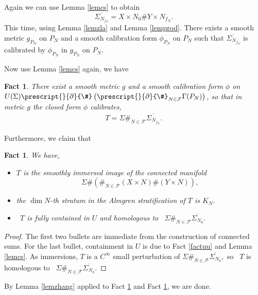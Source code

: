 \documentclass[11pt,a4paper]{amsart}
\numberwithin{equation}{section}
\newcommand{\Ga}{\Gamma}
\newcommand{\Si}{\Sigma}
\newcommand{\bcs}{\prescript{}{\pd}{\#}}
\newcommand{\ov}[1]{\overline{#1}}
\newcommand{\pd}{\partial}
\theoremstyle{plain}
\newtheorem{fact}[exam]{Fact}
\theoremstyle{definition}
\numberwithin{equation}{subsection}
\begin{document}
	Again we can use Lemma \ref{lemcs} to obtain $$\ov{\Si_{N_{f_N}}}=X\times N_0\# Y\times N_{f_N}.$$ This time, using Lemma \ref{lemzla} and Lemma \ref{lemprod}. There exists a smooth metric $g_{P_N}$ on $P_N$ and a smooth calibration form $\phi_{P_N}$ on $P_N$ such that $\ov{\Si_{N_{f_N}}}$ is calibrated by $\phi_{P_N}$ in $g_{P_N}$ on $P_N.$
	
	Now use Lemma \ref{lemcs} again, we have
	\begin{fact}\label{fctf1}
		There exist a smooth metric $g$ and a smooth calibration form $\phi$ on $U(\Si)\bcs\left(\prescript{}{\pd}{\#}_{N\in\mathcal{F}}\Ga(P_N)\right)$, so that in metric $g$ the closed form $\phi$ calibrates,
		\begin{align*}
			T=\Si\#_{N\in\mathcal{F}}\ov{\Si_{N_{f_N}}}.
		\end{align*}
	\end{fact}Furthermore, we claim that
	\begin{fact}\label{fctf2}We have,
		\begin{itemize}
			\item $		T
			$ is the smoothly immersed image of the connected manifold $$\Si\#\left(\#_{N\in\mathcal{F}}(X\times N)\#(Y\times N)\right),$$
			\item the $\dim N$-th stratum in the Almgren stratification of $		T
			$ is $K_N.$
			\item  $		T
			$ is fully contained in $U$ and homologous to  $		\Si\#_{N\in\mathcal{F}}\ov{\Si_{N_0}}.$
		\end{itemize}
	\end{fact}
	\begin{proof}
		The first two bullets are immediate from the construction of connected sums. For the last bullet, containment in $U$ is due to Fact \ref{factuu} and Lemma \ref{lemcs}. As immersions, $T$ is a $C^\infty$ small perturbation of $		\Si\#_{N\in\mathcal{F}}\ov{\Si_{N_0}},$ so  $T$ is homologous to  $		\Si\#_{N\in\mathcal{F}}\ov{\Si_{N_0}}.$ 
	\end{proof}
	By Lemma \ref{lemzhang} applied to Fact \ref{fctf1} and Fact \ref{fctf2}, we are done.		\printbibliography
\end{document}
